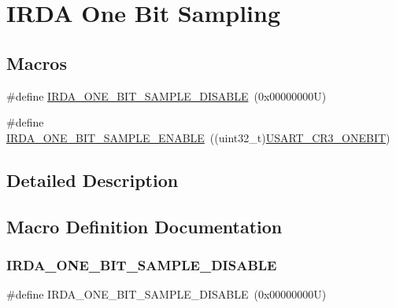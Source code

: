 \hypertarget{group___i_r_d_a___one___bit}{}\section{I\+R\+DA One Bit Sampling}
\label{group___i_r_d_a___one___bit}
\subsection*{Macros}
\begin{DoxyCompactItemize}
\item 
\#define \hyperlink{group___i_r_d_a___one___bit_ga373ec0d11671c4a4d2d2c0dd646d976c}{I\+R\+D\+A\+\_\+\+O\+N\+E\+\_\+\+B\+I\+T\+\_\+\+S\+A\+M\+P\+L\+E\+\_\+\+D\+I\+S\+A\+B\+LE}~(0x00000000\+U)
\item 
\#define \hyperlink{group___i_r_d_a___one___bit_ga0ff275354a873d6f9a37e982a7fdd1da}{I\+R\+D\+A\+\_\+\+O\+N\+E\+\_\+\+B\+I\+T\+\_\+\+S\+A\+M\+P\+L\+E\+\_\+\+E\+N\+A\+B\+LE}~((uint32\+\_\+t)\hyperlink{group___peripheral___registers___bits___definition_ga9a96fb1a7beab602cbc8cb0393593826}{U\+S\+A\+R\+T\+\_\+\+C\+R3\+\_\+\+O\+N\+E\+B\+IT})
\end{DoxyCompactItemize}


\subsection{Detailed Description}


\subsection{Macro Definition Documentation}
\mbox{\label{group___i_r_d_a___one___bit_ga373ec0d11671c4a4d2d2c0dd646d976c}} 
\subsubsection{\texorpdfstring{I\+R\+D\+A\+\_\+\+O\+N\+E\+\_\+\+B\+I\+T\+\_\+\+S\+A\+M\+P\+L\+E\+\_\+\+D\+I\+S\+A\+B\+LE}{IRDA\_ONE\_BIT\_SAMPLE\_DISABLE}}
{\footnotesize\ttfamily \#define I\+R\+D\+A\+\_\+\+O\+N\+E\+\_\+\+B\+I\+T\+\_\+\+S\+A\+M\+P\+L\+E\+\_\+\+D\+I\+S\+A\+B\+LE~(0x00000000\+U)}

